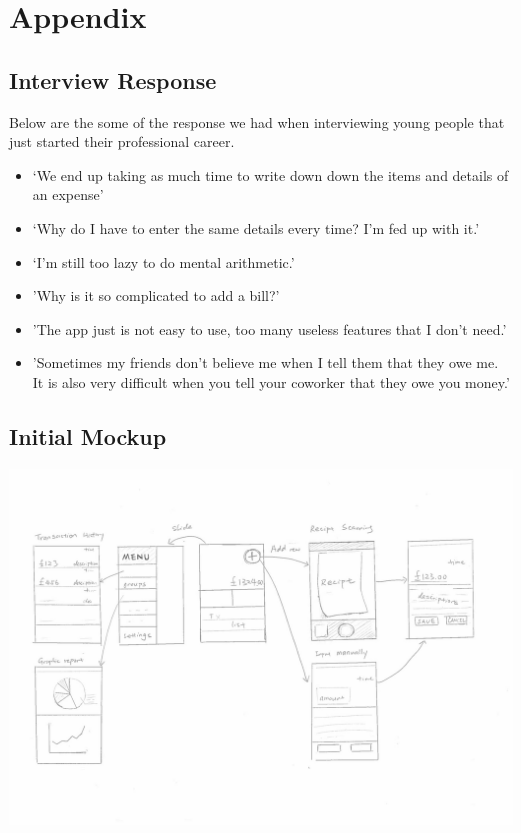\documentclass[a4wide, 11pt]{article}
\begin{document}
\section{Appendix}

\subsection{Interview Response}
\label{intRes}
Below are the some of the response we had when interviewing young people that just started their professional career.

\begin{itemize}
  \item ‘We end up taking as much time to write down down the items and details of an expense’
  \item ‘Why do I have to enter the same details every time? I'm fed up with it.’
  \item ‘I’m still too lazy to do mental arithmetic.’
  \item 'Why is it so complicated to add a bill?'
  \item 'The app just is not easy to use, too many useless features that I don't need.'
  \item 'Sometimes my friends don't believe me when I tell them that they owe me. It is also very difficult when you tell your coworker that they owe you money.'
\end{itemize}

\subsection{Initial Mockup}
\label{mockup}
\includegraphics[width=\textwidth]{initialMockup.jpg}
\end{document}
